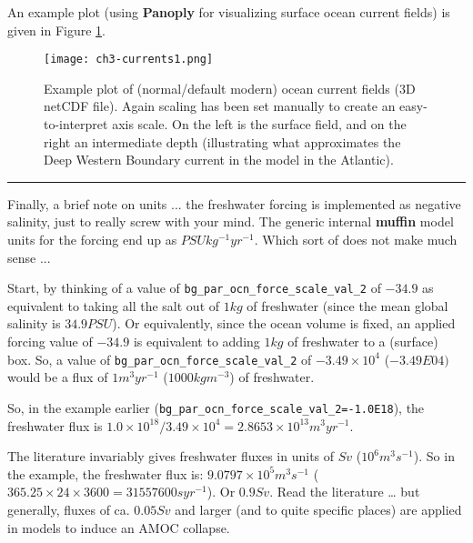 \documentclass[11pt,fleqn]{book} %
\begin{document}
\noindent An example plot (using \textbf{Panoply} for visualizing surface ocean current fields) is given in Figure \ref{fig:ch3-currents1}.

\begin{figure}
\texttt{[image: ch3-currents1.png]}\centering
\vspace{-0mm}
\caption{Example plot of (normal/default modern) ocean current fields (3D netCDF file). Again scaling has been set manually to create an easy-to-interpret axis scale. On the left is the surface field, and on the right an intermediate depth (illustrating what approximates the Deep Western Boundary current in the model in the Atlantic).}
\label{fig:ch3-currents1}
\end{figure}
\vspace{1mm}
\noindent\rule{4cm}{0.5pt}
\vspace{2mm}

\noindent Finally, a brief note on units ... the freshwater forcing is implemented as negative salinity, just to really screw with your mind. The generic internal \textbf{muffin} model units for the forcing end up as \(PSU kg^{-1} yr^{-1}\). Which sort of does not make much sense ...

Start, by thinking of a value of \texttt{bg\_par\_ocn\_force\_scale\_val\_2} of \(-34.9\) as equivalent to taking all the salt out of \(1 kg\) of freshwater (since the mean global salinity is \(34.9 PSU\)). Or equivalently, since the ocean volume is fixed, an applied forcing value of \(-34.9\) is equivalent to adding \(1 kg\) of freshwater to a (surface) box. So, a value of \texttt{bg\_par\_ocn\_force\_scale\_val\_2} of \(-3.49\times10^{4}\) (\(-3.49E04)\) would be a flux of \(1 m^{3} yr^{-1}\) (\(1000 kg m^{-3}\)) of freshwater.

So, in the example earlier (\texttt{bg\_par\_ocn\_force\_scale\_val\_2=-1.0E18}), the freshwater flux is \(1.0\times10^{18}/3.49\times10^{4} = 2.8653\times10^{13} m^{3} yr^{-1}\).

The literature invariably gives freshwater fluxes in units of \(Sv\) (\(10^{6} m^{3} s^{-1}\)). So in the example, the freshwater flux is: \(9.0797\times10^{5} m^{3} s^{-1}\) (\(365.25\times24\times3600 = 31557600 s yr^{-1}\)). Or \(0.9 Sv\). Read the literature … but generally, fluxes of ca. \(0.05 Sv\) and larger (and to quite specific places) are applied in models to induce an AMOC collapse.

\end{document}
